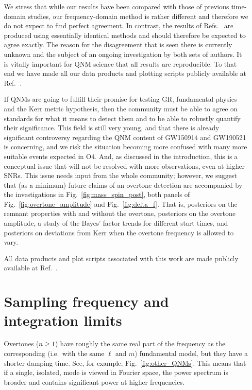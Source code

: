 We stress that while our results have been compared with those of previous time-domain studies, our frequency-domain method is rather different and therefore we do not expect to find perfect agreement. 
In contrast, the results of Refs.~\cite{Isi:2019aib, Cotesta:2022pci, Isi:2022mhy} are produced using essentially identical methods and should therefore be expected to agree exactly. 
The reason for the disagreement that is seen there is currently unknown and the subject of an ongoing investigation by both sets of authors.
It is vitally important for QNM science that all results are reproducible. To that end we have made all our data products and plotting scripts publicly available at Ref.~\cite{finch_eliot_2022_6949492}.

If QNMs are going to fulfill their promise for testing GR, fundamental physics and the Kerr metric hypothesis, then the community must be able to agree on standards for what it means to detect them and to be able to robustly quantify their significance. 
This field is still very young, and that there is already significant controversy regarding the QNM content of GW150914 and GW190521 is concerning, and we risk the situation becoming more confused with many more suitable events expected in O4.
And, as discussed in the introduction, this is a conceptual issue that will not be resolved with more observations, even at higher SNRs.
This issue needs input from the whole community; however, we suggest that (as a minimum) future claims of an overtone detection are accompanied by the investigations in Fig.~\ref{fig:mass_spin_post}, both panels of Fig.~\ref{fig:overtone_amplitude} and Fig.~\ref{fig:delta_f}.
That is, posteriors on the remnant properties with and without the overtone, posteriors on the overtone amplitude, a study of the Bayes' factor trends for different start times, and posteriors on deviations from Kerr when the overtone frequency is allowed to vary.

All data products and plot scripts associated with this work are made publicly available at Ref.~\cite{finch_eliot_2022_6949492}.


\section{Sampling frequency and integration limits}\label{app:fhigh}

Overtones ($n \geq 1$) have roughly the same real part of the frequency as the corresponding (i.e.\ with the same $\ell$ and $m$) fundamental model, but they have a shorter damping time. 
See, for example, Fig.~\ref{fig:other_QNMs}. 
This means that if a single, isolated, mode is viewed in Fourier space, the power spectrum is broader and contains significant power at higher frequencies.

